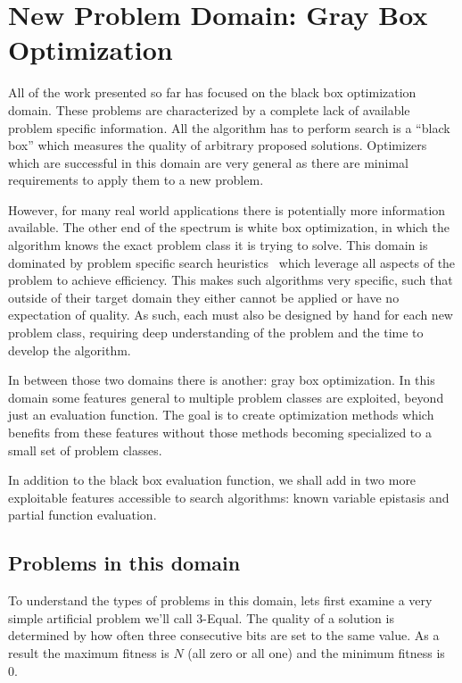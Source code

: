 \chapter{New Problem Domain: Gray Box Optimization}
\label{chap-graybox}
All of the work presented so far has focused on the black box optimization
domain. These problems are characterized by a complete lack of available
problem specific information. All the algorithm has to perform search
is a ``black box'' which measures the quality of arbitrary proposed
solutions. Optimizers which are successful in this domain are very general
as there are minimal requirements to apply them to a new problem.

However, for many real world applications there is potentially more information
available. The other end of the spectrum is white box optimization, in which
the algorithm knows the exact problem class it is trying to solve. This domain
is dominated by problem specific search
heuristics~\cite{een:2004:satsolver,sherrington:1975:isingsolver,wright:2000:solvingnk} which
leverage all aspects of the problem to achieve efficiency. This makes such
algorithms very specific, such that outside of their target domain they
either cannot be applied or have no expectation of quality. As such,
each must also be designed by hand for each new problem class, requiring
deep understanding of the problem and the time to develop the algorithm.

In between those two domains there is another: gray box optimization. In this
domain some features general to multiple problem classes are exploited, beyond
just an evaluation function. The goal is to create optimization methods which
benefits from these features without those methods becoming specialized to
a small set of problem classes.

In addition to the black box evaluation function, we shall
add in two more exploitable features accessible to search algorithms:
known variable epistasis and partial function evaluation.

\section{Problems in this domain}
To understand the types of problems in this domain, lets first examine
a very simple artificial problem we'll call 3-Equal. The quality
of a solution is determined by how often three consecutive bits are set
to the same value. As a result the maximum fitness is $N$ (all zero or all one) and the minimum fitness
is 0.

